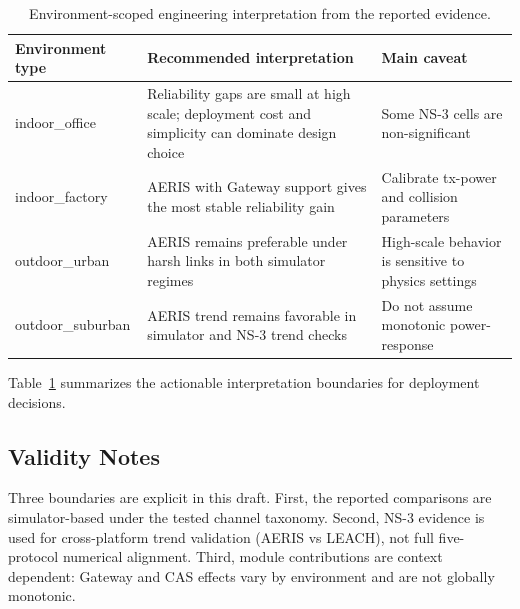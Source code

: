 ﻿\documentclass[sensors,article,submit,moreauthors,pdftex]{Definitions/mdpi}
\begin{document}
\begin{table}[H]
\caption{Environment-scoped engineering interpretation from the reported evidence.}
\label{tab:deployment_summary}
\centering
\small
\begin{tabular}{>{\raggedright\arraybackslash}p{} >{\raggedright\arraybackslash}p{} >{\raggedright\arraybackslash}p{}}
\toprule
Environment type & Recommended interpretation & Main caveat \\
\midrule
indoor\_office & Reliability gaps are small at high scale; deployment cost and simplicity can dominate design choice & Some NS-3 cells are non-significant \\
indoor\_factory & AERIS with Gateway support gives the most stable reliability gain & Calibrate tx-power and collision parameters \\
outdoor\_urban & AERIS remains preferable under harsh links in both simulator regimes & High-scale behavior is sensitive to physics settings \\
outdoor\_suburban & AERIS trend remains favorable in simulator and NS-3 trend checks & Do not assume monotonic power-response \\
\bottomrule
\end{tabular}
\normalsize
\end{table}

Table~\ref{tab:deployment_summary} summarizes the actionable interpretation boundaries for deployment decisions.

\subsection*{Validity Notes}
Three boundaries are explicit in this draft. First, the reported comparisons are simulator-based under the tested channel taxonomy. Second, NS-3 evidence is used for cross-platform trend validation (AERIS vs LEACH), not full five-protocol numerical alignment. Third, module contributions are context dependent: Gateway and CAS effects vary by environment and are not globally monotonic.
\end{document}
